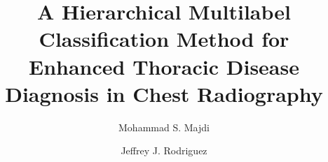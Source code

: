 \documentclass[preprint,12pt,authoryear]{elsarticle}
\begin{document}
\begin{frontmatter}

    \title{A Hierarchical Multilabel Classification Method for Enhanced Thoracic Disease Diagnosis in Chest Radiography}
    \author[label]{Mohammad S. Majdi}
    \author[label]{Jeffrey J. Rodriguez}

    \begin{abstract}  \end{abstract}



    \begin{keyword}
    
    \end{keyword}

\end{frontmatter}










%

\end{document}
